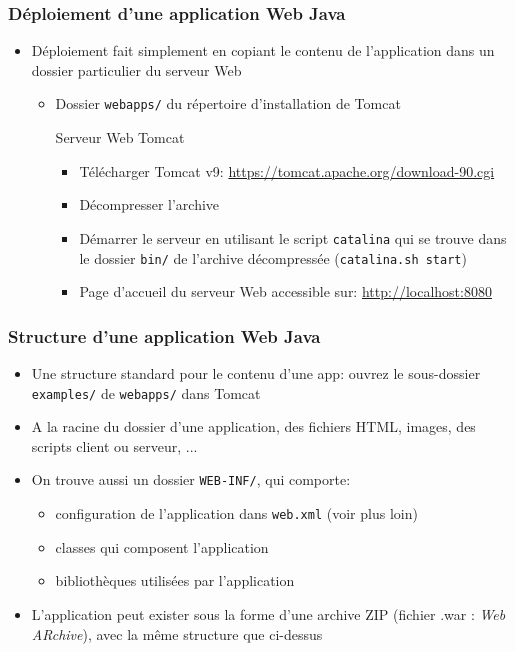 \documentclass{beamer}
\begin{document}
\begin{frame}
  \frametitle{Déploiement d'une application Web Java}
  \begin{itemize}
  \item Déploiement fait simplement en copiant le contenu de
    l'application dans un dossier particulier du serveur Web
    \begin{itemize}
    \item Dossier \texttt{webapps/} du répertoire d'installation de Tomcat
      \begin{block}{Serveur Web Tomcat}
        \begin{itemize}
        \item Télécharger Tomcat v9: \url{https://tomcat.apache.org/download-90.cgi}
        \item Décompresser l'archive
        \item Démarrer le serveur en utilisant le script
          \texttt{catalina} qui se trouve dans le dossier
          \texttt{bin/} de l'archive décompressée (\texttt{catalina.sh start})
        \item Page d'accueil du serveur Web accessible sur:
          \url{http://localhost:8080}
          \end{itemize}
    \end{block}
    \end{itemize}
  \end{itemize}
\end{frame}

\begin{frame}
  \frametitle{Structure d'une application Web Java}
  \begin{itemize}
  \item Une structure standard pour le contenu d'une app: ouvrez le sous-dossier \texttt{examples/} de \texttt{webapps/} dans Tomcat
  \item A la racine du dossier d'une application, des fichiers HTML,
    images, des scripts client ou serveur, ...
  \item On trouve aussi un dossier \texttt{WEB-INF/}, qui comporte:
    \begin{itemize}
    \item configuration de l'application dans \texttt{web.xml} (voir plus loin)
    \item classes qui composent l'application
    \item bibliothèques utilisées par l'application
    \end{itemize}
  \item L'application peut exister sous la forme d'une archive ZIP
    (fichier .war : \textit{Web ARchive}), avec la même structure que ci-dessus
  \end{itemize}
\end{frame}    
\end{document}
